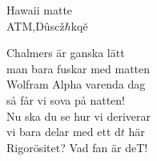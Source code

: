 {\Large Hawaii matte}\\{\tiny  ATM,Dûscž$\hbar$kqĕ}
\begin{vers}
Chalmers är ganska lätt\\
man bara fuskar med matten\\
Wolfram Alpha varenda dag\\
så får vi sova på natten! \\
Nu ska du se hur vi deriverar\\
vi bara delar med ett $\mathrm{d}t$ här\\
Rigorösitet? Vad fan är deT! \\
\end{vers}